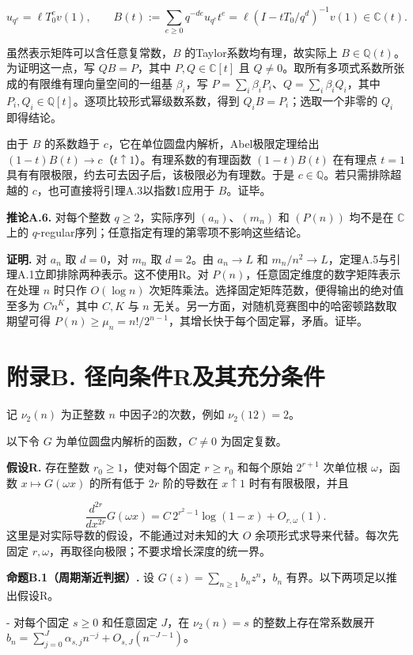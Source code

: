 \documentclass[UTF8,11pt,fontset=fandol]{ctexart}
\begin{document}
\[
u_{q^e}=\ell T_0^e v(1),\qquad B(t):=\sum_{e\ge0}q^{-de}u_{q^e}t^e=\ell(I-tT_0/q^d)^{-1}v(1)\in\mathbb C(t).
\]

虽然表示矩阵可以含任意复常数，$B$ 的Taylor系数均有理，故实际上 $B\in\mathbb Q(t)$。为证明这一点，写 $QB=P$，其中 $P,Q\in\mathbb C[t]$ 且 $Q\ne0$。取所有多项式系数所张成的有限维有理向量空间的一组基 $\beta_i$，写 $P=\sum_i\beta_iP_i$、$Q=\sum_i\beta_iQ_i$，其中 $P_i,Q_i\in\mathbb Q[t]$。逐项比较形式幂级数系数，得到 $Q_iB=P_i$；选取一个非零的 $Q_i$ 即得结论。

由于 $B$ 的系数趋于 $c$，它在单位圆盘内解析，Abel极限定理给出 $(1-t)B(t)\to c$（$t\uparrow1$）。有理系数的有理函数 $(1-t)B(t)$ 在有理点 $t=1$ 具有有限极限，约去可去因子后，该极限必为有理数。于是 $c\in\mathbb Q$。若只需排除超越的 $c$，也可直接将引理A.3以指数1应用于 $B$。证毕。

\textbf{推论A.6.} 对每个整数 $q\ge2$，实际序列 $(a_n)$、$(m_n)$ 和 $(P(n))$ 均不是在 $\mathbb C$ 上的 $q$-regular序列；任意指定有理的第零项不影响这些结论。

\textbf{证明.} 对 $a_n$ 取 $d=0$，对 $m_n$ 取 $d=2$。由 $a_n\to L$ 和 $m_n/n^2\to L$，定理A.5与引理A.1立即排除两种表示。这不使用R。对 $P(n)$，任意固定维度的数字矩阵表示在处理 $n$ 时只作 $O(\log n)$ 次矩阵乘法。选择固定矩阵范数，便得输出的绝对值至多为 $C n^K$，其中 $C,K$ 与 $n$ 无关。另一方面，对随机竞赛图中的哈密顿路数取期望可得 $P(n)\ge\mu_n=n!/2^{n-1}$，其增长快于每个固定幂，矛盾。证毕。

\section*{附录B. 径向条件R及其充分条件}
记 $\nu_2(n)$ 为正整数 $n$ 中因子2的次数，例如 $\nu_2(12)=2$。

以下令 $G$ 为单位圆盘内解析的函数，$C\ne0$ 为固定复数。

\textbf{假设R.} 存在整数 $r_0\ge1$，使对每个固定 $r\ge r_0$ 和每个原始 $2^{r+1}$ 次单位根 $\omega$，函数 $x\mapsto G(\omega x)$ 的所有低于 $2r$ 阶的导数在 $x\uparrow1$ 时有有限极限，并且

\[
\frac{d^{2r}}{dx^{2r}}G(\omega x)=C\,2^{r^2-1}\log(1-x)+O_{r,\omega}(1).
\]
这里是对实际导数的假设，不能通过对未知的大 $O$ 余项形式求导来代替。每次先固定 $r,\omega$，再取径向极限；不要求增长深度的统一界。

\textbf{命题B.1（周期渐近判据）.} 设 $G(z)=\sum_{n\ge1}b_nz^n$，$b_n$ 有界。以下两项足以推出假设R。

- 对每个固定 $s\ge0$ 和任意固定 $J$，在 $\nu_2(n)=s$ 的整数上存在常系数展开 $b_n=\sum_{j=0}^J\alpha_{s,j}n^{-j}+O_{s,J}(n^{-J-1})$。
\end{document}
